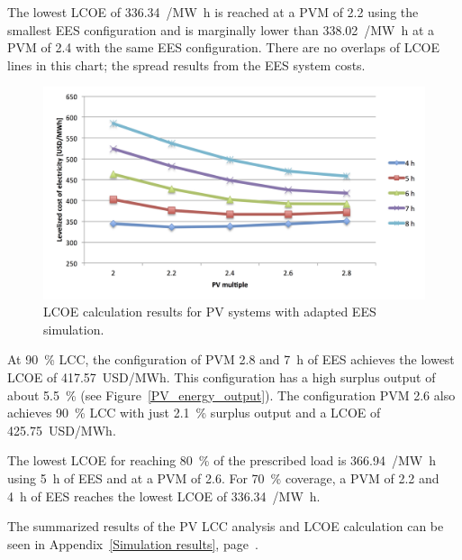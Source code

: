 The lowest \ac{LCOE} of \SI{336.34}{\usd/\mega\watt\hour} is reached at a \ac{PVM} of \num{2.2} using the smallest \ac{EES} configuration and is marginally lower than \SI{338.02}{\usd/\mega\watt\hour} at a \ac{PVM} of \num{2.4} with the same \ac{EES} configuration. There are no overlaps of \ac{LCOE} lines in this chart; the spread results from the \ac{EES} system costs.

\begin{figure}[htbp]  
\centering
\includegraphics[width=0.95\linewidth]{FIG/PV_LCOE}
\caption[LCOE calculation results for PV systems with adapted EES simulation.]{LCOE calculation results for PV systems with adapted EES simulation.}\label{PV_LCOE}
\end{figure}


At \SI{90}{\percent} \ac{LCC}, the configuration of \ac{PVM} \num{2.8} and \SI{7}{h} of \ac{EES} achieves the lowest \ac{LCOE} of \SI{417.57}{USD/MWh}. This configuration has a high surplus output of about \SI{5.5}{\percent} (see Figure~\ref{PV_energy_output}). The configuration \ac{PVM} \num{2.6} also achieves \SI{90}{\percent} \ac{LCC} with just \SI{2.1}{\percent} surplus output and a \ac{LCOE} of \SI{425.75}{USD/MWh}.


The lowest \ac{LCOE} for reaching \SI{80}{\percent} of the prescribed load is \SI{366.94}{\usd/\mega\watt\hour} using \SI{5}{h} of \ac{EES} and at a \ac{PVM} of \num{2.6}. For \SI{70}{\percent} coverage, a \ac{PVM} of \num{2.2} and \SI{4}{h} of \ac{EES} reaches the lowest \ac{LCOE} of \SI{336.34}{\usd/\mega\watt\hour}.

The summarized results of the \ac{PV} \ac{LCC} analysis and \ac{LCOE} calculation can be seen in Appendix~\ref{Simulation results}, page~\pageref{tbl: PV_results}.